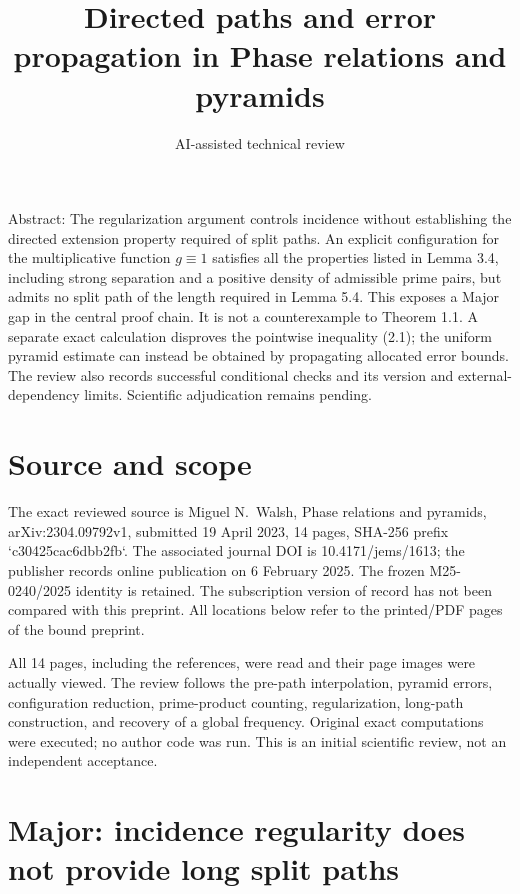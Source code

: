 \documentclass[10pt]{article}
\title{Directed paths and error propagation in Phase relations and pyramids}
\author{AI-assisted technical review}
\date{}
\begin{document}
\maketitle
Abstract: The regularization argument controls incidence without establishing the directed extension property required of split paths. An explicit configuration for the multiplicative function \(g\equiv1\) satisfies all the properties listed in Lemma 3.4, including strong separation and a positive density of admissible prime pairs, but admits no split path of the length required in Lemma 5.4. This exposes a Major gap in the central proof chain. It is not a counterexample to Theorem 1.1. A separate exact calculation disproves the pointwise inequality (2.1); the uniform pyramid estimate can instead be obtained by propagating allocated error bounds. The review also records successful conditional checks and its version and external-dependency limits. Scientific adjudication remains pending.\par
\section*{Source and scope}
The exact reviewed source is Miguel N. Walsh, Phase relations and pyramids, arXiv:2304.09792v1, submitted 19 April 2023, 14 pages, SHA-256 prefix `c30425cac6dbb2fb`. The associated journal DOI is 10.4171/jems/1613; the publisher records online publication on 6 February 2025. The frozen M25-0240/2025 identity is retained. The subscription version of record has not been compared with this preprint. All locations below refer to the printed/PDF pages of the bound preprint.\par
All 14 pages, including the references, were read and their page images were actually viewed. The review follows the pre-path interpolation, pyramid errors, configuration reduction, prime-product counting, regularization, long-path construction, and recovery of a global frequency. Original exact computations were executed; no author code was run. This is an initial scientific review, not an independent acceptance.\par
\section*{Major: incidence regularity does not provide long split paths}
\end{document}
